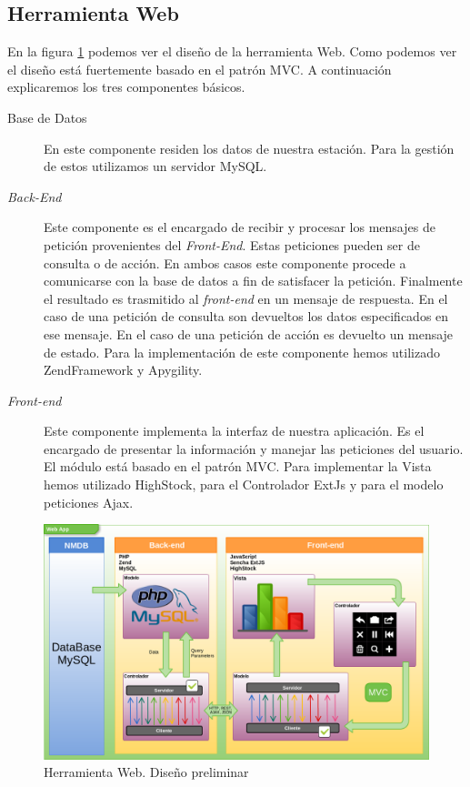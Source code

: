 	\subsection{Herramienta Web}
		En la figura \ref{fig:herramienta_web_preliminar} podemos ver el diseño de la herramienta Web. Como podemos ver el diseño está
		fuertemente basado en el patrón MVC\cite{MVCWiki}. A continuación explicaremos los tres componentes básicos.
		\begin{description}
			\item[Base de Datos]    
				En este componente residen los datos de nuestra estación. Para la gestión de estos utilizamos un servidor
				MySQL\cite{MySql}.
			\item[\emph{Back-End}]
				Este componente es el encargado de recibir y procesar los mensajes de petición provenientes del \emph{Front-End}.
				Estas peticiones pueden ser de consulta o de acción. En ambos casos este componente procede a comunicarse con la base
				de datos a fin de satisfacer la petición. Finalmente el resultado es trasmitido al \emph{front-end} en un mensaje de
				respuesta. En el caso de una petición de consulta son devueltos los datos especificados en ese mensaje. En el caso de
				una petición de acción es devuelto un mensaje de estado. Para la implementación de este componente hemos utilizado
				ZendFramework\cite{ZF} y Apygility\cite{Apigility}.
			\item[\emph{Front-end}] 
				Este componente implementa la interfaz de nuestra aplicación. Es el encargado de presentar la información y manejar
				las peticiones del usuario. El módulo está basado en el patrón MVC. Para implementar la Vista hemos utilizado
				HighStock\cite{HighStock}, para el Controlador ExtJs\cite{ExtJs} y para el modelo peticiones Ajax\cite{AjaxWiki}.
		\end{description}
		\begin{figure}[h]
			\centering
			\includegraphics[keepaspectratio, width=1\textwidth]{./img/herramienta_web_preliminar.png}
			\caption{Herramienta Web. Diseño preliminar}
			\label{fig:herramienta_web_preliminar}
		\end{figure}
